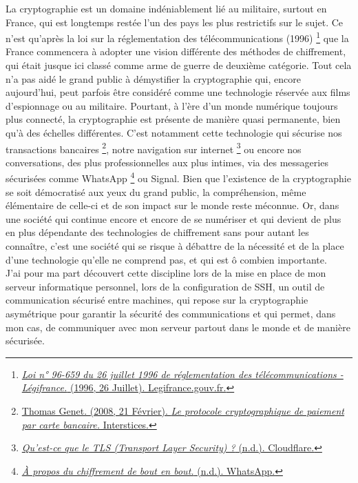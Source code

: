 \documentclass{article}
\begin{document}
\hspace{2em} La cryptographie est un domaine indéniablement lié au militaire, surtout en France, qui est longtemps restée l'un des pays les plus restrictifs sur le sujet. Ce n'est qu'après la loi sur la réglementation des télécommunications (1996)
\footnote{\href{https://www.legifrance.gouv.fr/loda/id/JORFTEXT000000733177}{\textit{Loi n° 96-659 du 26 juillet 1996 de réglementation des télécommunications - Légifrance.} (1996, 26 Juillet). Legifrance.gouv.fr.}}
que la France commencera à adopter une vision différente des méthodes de chiffrement, qui était jusque ici classé comme arme de guerre de deuxième catégorie. Tout cela n'a pas aidé le grand public à démystifier la cryptographie qui, encore aujourd'hui, peut parfois être considéré comme une technologie réservée aux films d'espionnage ou au militaire. Pourtant, à l'ère d'un monde numérique toujours plus connecté, la cryptographie est présente de manière quasi permanente, bien qu'à des échelles différentes. C'est notamment cette technologie qui sécurise nos transactions bancaires
\footnote{\href{https://interstices.info/le-protocole-cryptographique-de-paiement-par-carte-bancaire/}{Thomas Genet. (2008, 21 Février). \textit{Le protocole cryptographique de paiement par carte bancaire.} Interstices.}},
notre navigation sur internet
\footnote{\href{https://www.cloudflare.com/fr-fr/learning/ssl/transport-layer-security-tls/}{\textit{Qu’est-ce que le TLS (Transport Layer Security) ?} (n.d.). Cloudflare.}}
ou encore nos conversations, des plus professionnelles aux plus intimes, via des messageries sécurisées comme WhatsApp
\footnote{\href{https://faq.whatsapp.com/820124435853543}{\textit{À propos du chiffrement de bout en bout.} (n.d.). WhatsApp.}}
ou Signal.
Bien que l'existence de la cryptographie se soit démocratisé aux yeux du grand public, la compréhension, même élémentaire de celle-ci et de son  impact sur le monde reste méconnue. Or, dans une société qui continue encore et encore de se numériser et qui devient de plus en plus dépendante des technologies de chiffrement sans pour autant les connaître, c'est une société qui se risque à débattre de la nécessité et de la place d'une technologie qu'elle ne comprend pas, et qui est ô combien importante. \\

J'ai pour ma part découvert cette discipline lors de la mise en place de mon serveur informatique personnel, lors de la configuration de SSH, un outil de communication sécurisé entre machines, qui repose sur la cryptographie asymétrique pour garantir la sécurité des communications et qui permet, dans mon cas, de communiquer avec mon serveur partout dans le monde et de manière sécurisée. \\
\end{document}
